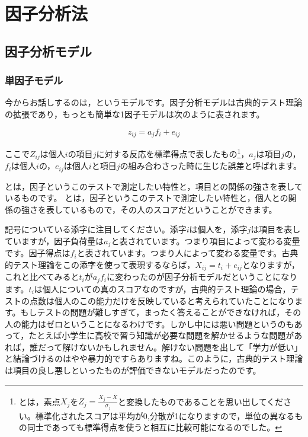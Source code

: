 \documentclass{ltjsbook}
\begin{document}
\chapter{因子分析法}
\label{H03_FA}
\section{因子分析モデル}
\subsection{単因子モデル}
今からお話しするのは，というモデルです。因子分析モデルは古典的テスト理論の拡張であり，もっとも簡単な1因子モデルは次のように表されます。

\[ z_{ij} = a_j f_i + e_{ij} \]

ここで$Z_{ij}$は個人$i$の項目$j$に対する反応を標準得点で表したもの\footnote{とは，素点$X_j$を$Z_j = \frac{X_j - \bar{X}}{\sigma_j}$と変換したものであることを思い出してください。標準化されたスコアは平均が0,分散が1になりますので，単位の異なるもの同士であっても標準得点を使うと相互に比較可能になるのでした。}，$a_j$は項目$j$の，$f_i$は個人$i$の，$e_{ij}$は個人$i$と項目$j$の組み合わさった時に生じた誤差と呼ばれます。

とは，因子というこのテストで測定したい特性と，項目との関係の強さを表しているものです。
とは，因子というこのテストで測定したい特性と，個人との関係の強さを表しているもので，その人のスコアだということができます。

記号についている添字に注目してください。添字$i$は個人を，添字$j$は項目を表していますが，因子負荷量は$a_j$と表されています。つまり項目によって変わる変量です。因子得点は$f_i$と表されています。つまり人によって変わる変量です。古典的テスト理論をこの添字を使って表現するならば，$X_{ij} = t_i + e_{ij}$となりますが，これと比べてみると$t_i$が$a_jf_i$に変わったのが因子分析モデルだということになります。$t_i$は個人についての真のスコアなのですが，古典的テスト理論の場合，テストの点数は個人のこの能力だけを反映していると考えられていたことになります。もしテストの問題が難しすぎて，まったく答えることができなければ，その人の能力はゼロということになるわけです。しかし中には悪い問題というのもあって，たとえば小学生に高校で習う知識が必要な問題を解かせるような問題があれば，誰だって解けないかもしれません。解けない問題を出して「学力が低い」と結論づけるのはやや暴力的ですらありますね。このように，古典的テスト理論は項目の良し悪しといったものが評価できないモデルだったのです。
\end{document}
